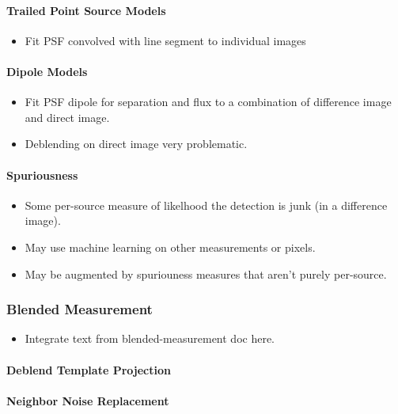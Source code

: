 \paragraph{Trailed Point Source Models}
\label{sec:acTrailedPointSourceModels}
\begin{itemize}
\item Fit PSF convolved with line segment to individual images
\end{itemize}

\paragraph{Dipole Models}
\label{sec:acDipoleModels}
\begin{itemize}
\item Fit PSF dipole for separation and flux to a combination of difference image and direct image.
\item Deblending on direct image very problematic.
\end{itemize}

\paragraph{Spuriousness}
\label{sec:acSpuriousnessAlgorithms}
\begin{itemize}
\item Some per-source measure of likelhood the detection is junk (in a difference image).
\item May use machine learning on other measurements or pixels.
\item May be augmented by spuriouness measures that aren't purely per-source.
\end{itemize}

\subsubsection{Blended Measurement}
\label{sec:acBlendedMeasurement}
\begin{itemize}
\item Integrate text from blended-measurement doc here.
\end{itemize}

\paragraph{Deblend Template Projection}
\label{sec:acDeblendTemplateProjection}
\paragraph{Neighbor Noise Replacement}
\label{sec:acReplaceNeighborsWithNoise}
